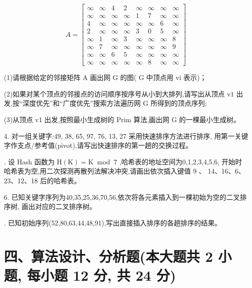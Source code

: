 \[
A = \left\lbrack  \begin{matrix} \infty & \infty & 4 & 2 & \infty & \infty & \infty & \infty \\  \infty & \infty & \infty & \infty & 1 & 7 & \infty & \infty \\  4 & \infty & \infty & \infty & \infty & \infty & 6 & \infty \\  2 & \infty & \infty & \infty & 3 & 0 & 5 & \infty \\  \infty & 1 & \infty & 3 & \infty & \infty & \infty & 8 \\  \infty & 7 & \infty & \infty & \infty & \infty & \infty & 9 \\  \infty & \infty & 6 & 5 & \infty & \infty & \infty & \infty \\  \infty & \infty & \infty & \infty & \infty & 8 & \infty & \infty  \end{matrix}\right\rbrack
\]

(1)请根据给定的邻接矩阵 \(\mathrm{A}\) 画出网 \(\mathrm{G}\) 的图( \(\mathrm{G}\) 中顶点用 \(\mathrm{{vi}}\) 表示)；

(2)如果对某个顶点的邻接点的访问顺序按序号从小到大排列,请写出从顶点 \(\mathrm{v}1\) 出发,按“深度优先”和“广度优先”搜索方法遍历网 \(\mathrm{G}\) 所得到的顶点序列; 

(3)从顶点 v1 出发,按照最小生成树的 Prim 算法,画出网 \(\mathrm{G}\) 的一棵最小生成树。
\vspace{11em}

4. 对一组关键字:49, 38, 65, 97, 76, 13, 27 采用快速排序方法进行排序, 用第一关键字作支点/参考值(pivot),请写出快速排序的第一趟的交换过程。
\vspace{10em}

. 设 Hash 函数为 \(\mathrm{H}\left( \mathrm{K}\right)  = \mathrm{K}{\;\operatorname{mod}\;7}\) ,哈希表的地址空间为0,1,2,3,4,5,6, 开始时哈希表为空,用二次探测再散列法解决冲突,请画出依次插入键值 9 、 14、16、6、23、12、18 后的哈希表。
\vspace{15em}

6. 已知关键字序列为40,35,25,36,70,56,依次将各元素插入到一棵初始为空的二叉排序树, 画出对应的二叉排序树。
\vspace{15em}

. 已知初始序列(52,80,63,44,48,91),写出直接插入排序的各趟排序的结果。 
\vspace{26em}

\section*{四、算法设计、分析题(本大题共 2 小题, 每小题 12 分, 共 24 分)}

